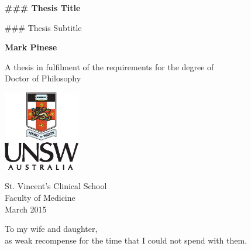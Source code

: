 \documentclass[11pt,a4paper,final,twoside]{memoir}
\begin{document}
\increaseBuild
\cleardoublepage

\begin{titlepage}
    \begin{center}
        \vspace*{1cm}
        
        \Large
        \textbf{### Thesis Title}
        
        \vspace{0.5cm}
        ### Thesis Subtitle
        
        \vspace{1.5cm}
        
        \normalsize
        \textbf{Mark Pinese}
        
        \vfill
        
        A thesis in fulfilment of the requirements for the degree of\\
        Doctor of Philosophy
        
        \vspace{2cm}
        
        \includegraphics[width=0.25\textwidth]{resources/PortraitColourPos}

        \vspace{1cm}

        St. Vincent's Clinical School\\
        Faculty of Medicine\\

		\vspace{0.8cm}
        March 2015
    \end{center}
\end{titlepage}


\cleardoublepage


\frontmatter

\cleardoublepage
{}
\begin{adjustwidth}{2em}{2em}
\noindent %
To my wife and daughter, \\
as weak recompense for the time that I could not spend with them.
\end{adjustwidth}
\end{document}
